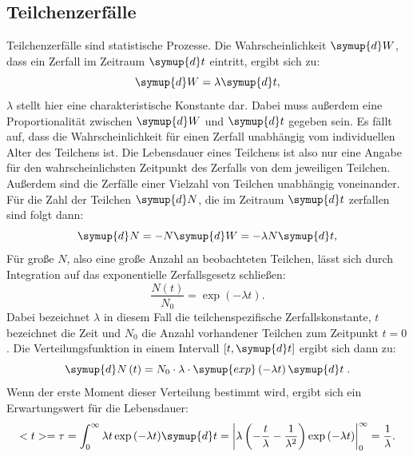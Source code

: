 \documentclass[
  bibliography=totoc,     %
  captions=tableheading,  %
  titlepage=firstiscover, %
]{scrartcl}
\begin{document}
  \subsection{Teilchenzerfälle}
  \label{sec:teilchenzerfälle}
  Teilchenzerfälle sind statistische Prozesse.
  Die Wahrscheinlichkeit $\symup{d}W$,
  dass ein Zerfall im Zeitraum $\symup{d}t$ eintritt, ergibt sich zu:
  \begin{equation*}
    \symup{d}W = \lambda\symup{d}t,
  \end{equation*}
  $\lambda$ stellt hier eine charakteristische Konstante dar. Dabei muss
  außerdem eine Proportionalität zwischen $\symup{d}W$ und $\symup{d}t$ gegeben
  sein. Es fällt auf, dass die Wahrscheinlichkeit für einen Zerfall unabhängig
  vom individuellen Alter des Teilchens ist. Die Lebensdauer eines Teilchens ist
  also nur eine Angabe für den wahrscheinlichsten Zeitpunkt des Zerfalls von dem
  jeweiligen Teilchen. Außerdem sind die Zerfälle einer Vielzahl von Teilchen
  unabhängig voneinander. Für die Zahl der Teilchen $\symup{d}N$, die im
  Zeitraum $\symup{d}t$ zerfallen sind folgt dann:
  \begin{equation*}
    \symup{d}N = -N\symup{d}W = - \lambda N \symup{d}t,
  \end{equation*}
  Für große $N$, also eine große Anzahl an beobachteten Teilchen, lässt sich
  durch Integration auf das exponentielle Zerfallsgesetz schließen:
  \begin{equation}
    \frac{N(t)}{N_0} = \exp{(-\lambda t)}.
    \label{eq:expozerfall}
  \end{equation}
  Dabei bezeichnet $\lambda$ in diesem Fall die teilchenspezifische
  Zerfallskonstante, $t$ bezeichnet die Zeit und $N_0$ die Anzahl vorhandener
  Teilchen zum Zeitpunkt $t=0$. Die Verteilungsfunktion in einem Intervall
  $[t, \symup{d}t]$ ergibt sich dann zu:
  \begin{equation*}
    \symup{d}N \left( t \right) = N_0 \cdot \lambda \cdot \symup{exp} \left( - \lambda t \right) \symup{d}t \; .
  \end{equation*}
  Wenn der erste Moment dieser Verteilung bestimmt wird, ergibt sich ein
  Erwartungswert für die Lebensdauer:
  \begin{equation}
    <t> = \tau = \int_0^\infty \lambda t \exp{(-\lambda t)} \symup{d}t =
    \left| \lambda \left( -\frac{t}{\lambda} - \frac{1}{\lambda^2} \right)\exp{(-\lambda t)}
    \right|_0^\infty = \frac{1}{\lambda}.
    \label{eq:tau}
  \end{equation}
\end{document}
